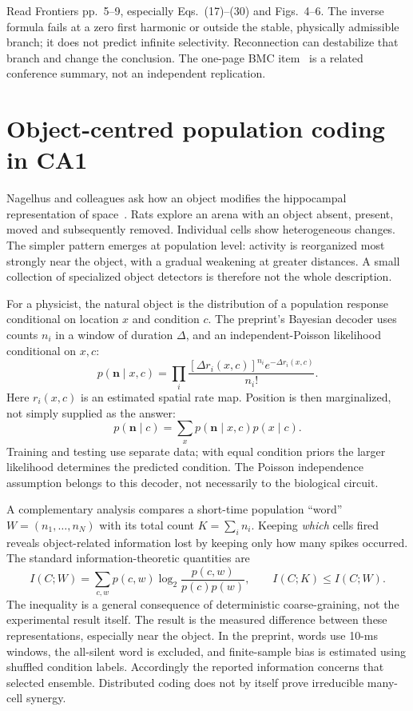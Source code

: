 \documentclass[11pt,a4paper]{article}
\begin{document}
Read Frontiers pp.~5--9, especially Eqs.~(17)--(30) and Figs.~4--6. The inverse formula fails at a zero first harmonic or outside the stable, physically admissible branch; it does not predict infinite selectivity. Reconnection can destabilize that branch and change the conclusion. The one-page BMC item~\cite{poster} is a related conference summary, not an independent replication.

\section{Object-centred population coding in CA1}
Nagelhus and colleagues ask how an object modifies the hippocampal representation of space~\cite{object}. Rats explore an arena with an object absent, present, moved and subsequently removed. Individual cells show heterogeneous changes. The simpler pattern emerges at population level: activity is reorganized most strongly near the object, with a gradual weakening at greater distances. A small collection of specialized object detectors is therefore not the whole description.

For a physicist, the natural object is the distribution of a population response conditional on location $x$ and condition $c$. The preprint's Bayesian decoder uses counts $n_i$ in a window of duration $\Delta$, and an independent-Poisson likelihood conditional on $x,c$:
\[p(\mathbf n\mid x,c)=\prod_i\frac{[\Delta r_i(x,c)]^{n_i}e^{-\Delta r_i(x,c)}}{n_i!}.\]
Here $r_i(x,c)$ is an estimated spatial rate map. Position is then marginalized, not simply supplied as the answer:
\[p(\mathbf n\mid c)=\sum_xp(\mathbf n\mid x,c)p(x\mid c).\]
Training and testing use separate data; with equal condition priors the larger likelihood determines the predicted condition. The Poisson independence assumption belongs to this decoder, not necessarily to the biological circuit.

A complementary analysis compares a short-time population ``word'' $W=(n_1,\ldots,n_N)$ with its total count $K=\sum_i n_i$. Keeping \emph{which} cells fired reveals object-related information lost by keeping only how many spikes occurred. The standard information-theoretic quantities are
\[I(C;W)=\sum_{c,w}p(c,w)\log_2\frac{p(c,w)}{p(c)p(w)},\qquad I(C;K)\leq I(C;W).\]
The inequality is a general consequence of deterministic coarse-graining, not the experimental result itself. The result is the measured difference between these representations, especially near the object. In the preprint, words use 10-ms windows, the all-silent word is excluded, and finite-sample bias is estimated using shuffled condition labels. Accordingly the reported information concerns that selected ensemble. Distributed coding does not by itself prove irreducible many-cell synergy.
\end{document}
